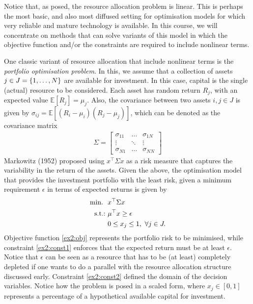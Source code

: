 Notice that, as posed, the resource allocation problem is linear. This is perhaps the most basic, and also most diffused setting for optimisation models for which very reliable and mature technology is available. In this course, we will concentrate on methods that can solve variants of this model in which the objective function and/or the constraints are required to include nonlinear terms. 

One classic variant of resource allocation that include nonlinear terms is the \emph{portfolio optimisation problem}. In this, we assume that a collection of assets $j \in J = \left\{ 1,\dots, N \right \}$ are available for investment. In this case, capital is the single (actual) resource to be considered. Each asset has random return $R_j$, with an expected value $\mathbb{E}[R_j] = \mu_j$. Also, the covariance between two assets $i,j \in J$ is given by $\sigma_{ij} = \mathbb{E}[(R_i - \mu_i)(R_j - \mu_j)]$, which can be denoted as the covariance matrix 
%
\begin{align*}
	\Sigma = \begin{bmatrix}
		\sigma_{11} & \dots & \sigma_{1N} \\ 
		\vdots      & \ddots & \vdots \\
		\sigma_{N1}  & \dots & \sigma_{NN}
	\end{bmatrix}
\end{align*}
%
Markowitz (1952) proposed using $x^\top\Sigma x$ as a risk measure that captures the variability in the return of the assets. Given the above, the optimisation model that provides the investment portfolio with the least risk, given a minimum requirement $\epsilon$ in terms of expected returns is given by
%
\begin{align}
	\mathop{\text{min.~}} \ &  x^\top\Sigma x \label{ex2:obj} \\
	\mathop{\text{s.t.:~}} & \mu^\top x  \geq \epsilon \label{ex2:const1}\\
	& 0 \leq x_j \leq 1, \ \forall j \in J. \label{ex2:const2}
\end{align} 
%
Objective function \eqref{ex2:obj} represents the portfolio risk to be minimised, while constraint \eqref{ex2:const1} enforces that the expected return must be at least $\epsilon$. Notice that $\epsilon$ can be seen as a resource that has to be (at least) completely depleted if one wants to do a parallel with the resource allocation structure discussed early. Constraint \eqref{ex2:const2} defined the domain of the decision variables. Notice how the problem is posed in a scaled form, where $x_j \in [0,1]$ represents a percentage of a hypothetical available capital for investment.

